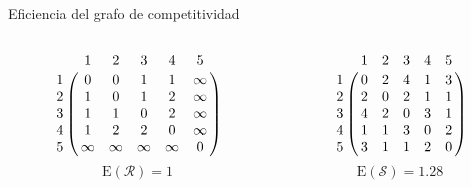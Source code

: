 \documentclass[10pt]{beamer}
\begin{document}
	\begin{frame}{Eficiencia del grafo de competitividad}
		\begin{ejemplo}[continuación]
			\begin{columns}[t] %
				\begin{column}{.50\textwidth}
					\begin{equation*}
					\bordermatrix{
						& 1 & 2 & 3 & 4 & 5 \cr
						1 &	0 & 0 & 1 & 1 & \infty \cr
						2 & 1 & 0 & 1 & 2 & \infty \cr
						3 & 1 & 1 & 0 & 2 & \infty \cr
						4 & 1 & 2 & 2 & 0 & \infty \cr
						5 & \infty & \infty & \infty & \infty  &  0  \cr
					}
					\end{equation*}
					\[ \mathrm{E}(\mathcal{R}) = 1 \]
				\end{column}%
				\hfill%
				\begin{column}{.50\textwidth}
					\begin{equation*}
					\bordermatrix{
						& 1 & 2 & 3 & 4 & 5 \cr
						1 &	0 & 2 & 4 & 1 & 3 \cr
						2 & 2 & 0 & 2 & 1 & 1 \cr
						3 & 4 & 2 & 0 & 3 & 1 \cr
						4 & 1 & 1 & 3 & 0 & 2 \cr
						5 & 3 & 1 & 1 & 2 & 0  \cr
					}
					\end{equation*}
					\[ \mathrm{E}(\mathcal{S}) = 1.28 \]
				\end{column}%
			\end{columns}
		\end{ejemplo}
	\end{frame}
	
		
\end{document}
